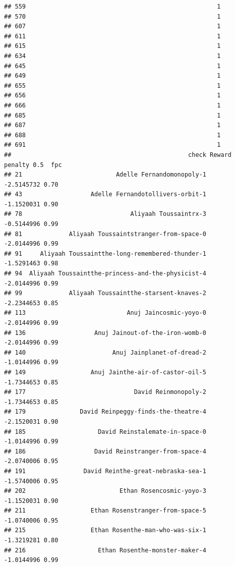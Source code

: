 \documentclass[
]{article}
\begin{document}
\begin{verbatim}
## 559                                                     1
## 570                                                     1
## 607                                                     1
## 611                                                     1
## 615                                                     1
## 634                                                     1
## 645                                                     1
## 649                                                     1
## 655                                                     1
## 656                                                     1
## 666                                                     1
## 685                                                     1
## 687                                                     1
## 688                                                     1
## 691                                                     1
##                                                 check Reward penalty 0.5  fpc
## 21                          Adelle Fernandomonopoly-1         -2.5145732 0.70
## 43                   Adelle Fernandotollivers-orbit-1         -1.1520031 0.90
## 78                              Aliyaah Toussaintrx-3         -0.5144996 0.99
## 81             Aliyaah Toussaintstranger-from-space-0         -2.0144996 0.99
## 91     Aliyaah Toussaintthe-long-remembered-thunder-1         -1.5291463 0.98
## 94  Aliyaah Toussaintthe-princess-and-the-physicist-4         -2.0144996 0.99
## 99             Aliyaah Toussaintthe-starsent-knaves-2         -2.2344653 0.85
## 113                            Anuj Jaincosmic-yoyo-0         -2.0144996 0.99
## 136                   Anuj Jainout-of-the-iron-womb-0         -2.0144996 0.99
## 140                        Anuj Jainplanet-of-dread-2         -1.0144996 0.99
## 149                  Anuj Jainthe-air-of-castor-oil-5         -1.7344653 0.85
## 177                              David Reinmonopoly-2         -1.7344653 0.85
## 179               David Reinpeggy-finds-the-theatre-4         -2.1520031 0.90
## 185                    David Reinstalemate-in-space-0         -1.0144996 0.99
## 186                   David Reinstranger-from-space-4         -2.0740006 0.95
## 191                David Reinthe-great-nebraska-sea-1         -1.5740006 0.95
## 202                          Ethan Rosencosmic-yoyo-3         -1.1520031 0.90
## 211                  Ethan Rosenstranger-from-space-5         -1.0740006 0.95
## 215                  Ethan Rosenthe-man-who-was-six-1         -1.3219281 0.80
## 216                    Ethan Rosenthe-monster-maker-4         -1.0144996 0.99

\end{verbatim}
\end{document}
